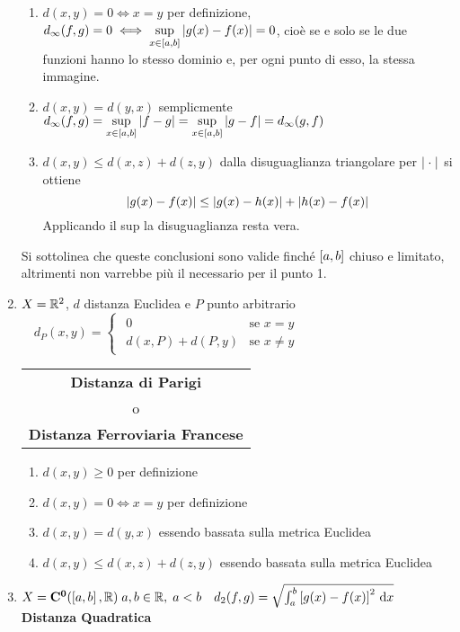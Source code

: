 \begin{example}
\begin{enumerate}
\begin{enumerate}[label=\arabic*.]
				\item $d(x,y) = 0 \iff x = y$ per definizione, $d_\infty(f,g) = 0 \iff \sup\limits_{x\in\left[a,b\right]}\left|g(x)-f(x)\right| = 0$, cioè se e solo se le due funzioni hanno lo stesso dominio e, per ogni punto di esso, la stessa immagine.
				\item $d(x,y)=d(y,x)$ semplicmente $d_{\infty}(f,g) = \sup\limits_{x\in\left[a,b\right]}\left|f-g\right| = \sup\limits_{x\in\left[a,b\right]}\left|g-f\right| = d_{\infty}(g,f)$
				\item $d(x,y) \leq d(x,z) + d(z,y)$ dalla disuguaglianza triangolare per $\left|\;\cdot\;\right|$ si ottiene
					\[\left|g(x)-f(x)\right| \leq \left|g(x)-h(x)\right|+\left|h(x)-f(x)\right|\]
					Applicando il sup la disuguaglianza resta vera.
			\end{enumerate}
			\begin{note}
				Si sottolinea che queste conclusioni sono valide finché $\left[a,b\right]$ chiuso e limitato, altrimenti non varrebbe più il  necessario per il punto 1. %
			\end{note}
		\item $X=\mathbb{R}^2$, $d$ distanza Euclidea e $P$ punto arbitrario\newline
			$\quad d_P(x,y)=
			\begin{cases}
				\begin{array}{ll}
					0 & \text{se } x = y\\
					d(x,P) + d(P,y) & \text{se } x \neq y
				\end{array}
			\end{cases}$ \hfill
			{\footnotesize
				\begin{tabular}{c}
					\textbf{Distanza di Parigi}\\[-1ex]
					o\\[-1ex]
					\textbf{Distanza Ferroviaria Francese}
				\end{tabular}
			} \label{ex:dist_parigi}
			\begin{enumerate}[label=\arabic*.]
				\item $d(x,y) \geq 0$ per definizione
				\item $d(x,y) = 0 \iff x = y$ per definizione
				\item $d(x,y)=d(y,x)$ essendo bassata sulla metrica Euclidea
				\item $d(x,y) \leq d(x,z) + d(z,y)$ essendo bassata sulla metrica Euclidea
			\end{enumerate}
		\item $X=\mathbf{C^{0}}(\left[a,b\right],\mathbb{R})\;a,b\in\mathbb{R},\;a<b \quad d_2(f,g) = \sqrt{\int_a^b\left[g(x)-f(x)\right]^2 \,\mathrm{d}{x}}$ \hfill {\footnotesize\textbf{Distanza Quadratica}}

\end{enumerate}
\end{example}
